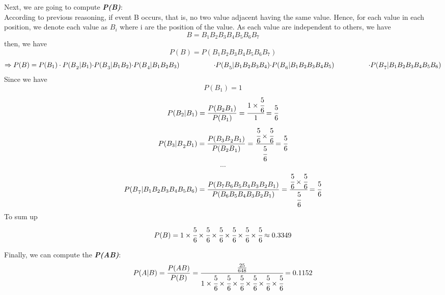 \documentclass[11pt]{article}
\begin{document}
Next, we are going to compute \textbf{\emph{P(B)}}:\\
According to previous reasoning, if event B occurs, that is, no two
value adjacent having the same value. Hence, for each value in each
position, we denote each value as \({ B }_{ i }\) where i are the
position of the value. As each value are independent to others, we have
\[B={ B }_{ 1 }{ B }_{ 2 }{ B }_{ 3 }{ B }_{ 4 }{ B }_{ 5 }{ B }_{ 6 }{ B }_{ 7 }\]
then, we have
\[P(B)=P({ B }_{ 1 }{ B }_{ 2 }{ B }_{ 3 }{ B }_{ 4 }{ B }_{ 5 }{ B }_{ 6 }{ B }_{ 7 })\]
\[\Rightarrow P(B)=P({ B }_{ 1 }{ )\cdot P(B }_{ 2 }|{ B }_{ 1 }){ \cdot P(B }_{ 3 }|{ B }_{ 1 }{ B }_{ 2 }){ \cdot P(B }_{ 4 }|{ B }_{ 1 }{ B }_{ 2 }{ B }_{ 3 })\\ \quad \quad \quad \quad \quad { \cdot P(B }_{ 5 }|{ B }_{ 1 }{ B }_{ 2 }{ B }_{ 3 }{ B }_{ 4 }){ \cdot P(B }_{ 6 }|{ B }_{ 1 }{ B }_{ 2 }{ B }_{ 3 }{ B }_{ 4 }{ B }_{ 5 })\\ \quad \quad \quad \quad \quad { \cdot P(B }_{ 7 }|{ B }_{ 1 }{ B }_{ 2 }{ B }_{ 3 }{ B }_{ 4 }{ B }_{ 5 }{ B }_{ 6 })\]
Since we have \[P({ B }_{ 1 })=1\]
\[P({ B }_{ 2 }|{ B }_{ 1 })=\frac { P({ B }_{ 2 }{ B }_{ 1 }) }{ P({ B }_{ 1 })}=\cfrac { 1\times \cfrac { 5 }{ 6 }  }{ 1 } =\cfrac { 5 }{ 6 } \]
\[P({ { B }_{ 3 }|B }_{ 2 }{ B }_{ 1 })=\frac { P({ { B }_{ 3 }B }_{ 2 }{ B }_{ 1 }) }{ P({ { B }_{ 2 }B }_{ 1 }) } =\cfrac { \cfrac { 5 }{ 6 } \times \cfrac { 5 }{ 6 }  }{ \cfrac { 5 }{ 6 }  } =\cfrac { 5 }{ 6 } \]
\[\cdots \]
\[{ P(B }_{ 7 }|{ B }_{ 1 }{ B }_{ 2 }{ B }_{ 3 }{ B }_{ 4 }{ B }_{ 5 }{ B }_{ 6 })=\frac { P({ B }_{ 7 }{ { B }_{ 6 }{ B }_{ 5 } }{ B }_{ 4 }{ B }_{ 3 }{ B }_{ 2 }{ B }_{ 1 }) }{ P({ { B }_{ 6 }{ B }_{ 5 } }{ B }_{ 4 }{ B }_{ 3 }{ B }_{ 2 }{ B }_{ 1 }) } =\cfrac { \cfrac { 5 }{ 6 } \times \cfrac { 5 }{ 6 }  }{ \cfrac { 5 }{ 6 }  } =\cfrac { 5 }{ 6 } \]
To sum up
\[{ P(B })=1\times \cfrac { 5 }{ 6 } \times \cfrac { 5 }{ 6 } \times \cfrac { 5 }{ 6 } \times \cfrac { 5 }{ 6 } \times \cfrac { 5 }{ 6 } \times \cfrac { 5 }{ 6 } \approx 0.3349\]

Finally, we can compute the \textbf{\emph{P(A\textbar{}B)}}:
\[P(A|B)=\frac { P(AB) }{ P(B) }=\cfrac { \frac { 25 }{ 648 }  }{ 1\times \cfrac { 5 }{ 6 } \times \cfrac { 5 }{ 6 } \times \cfrac { 5 }{ 6 } \times \cfrac { 5 }{ 6 } \times \cfrac { 5 }{ 6 } \times \cfrac { 5 }{ 6 }  } = 0.1152\]
\end{document}
